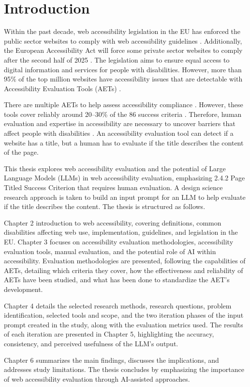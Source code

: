\chapter{Introduction\label{intro}}

Within the past decade, web accessibility legislation in the EU has enforced the public sector websites to comply with web accessibility guidelines \citep{eudirective2016}. Additionally, the European Accessibility Act will force some private sector websites to comply after the second half of 2025 \citep{eudirective2019}. The legislation aims to ensure equal access to digital information and services for people with disabilities. However, more than 95\% of the top million websites have accessibility issues that are detectable with Accessibility Evaluation Tools (AETs) \citep{webaimmillions}.

There are multiple AETs to help assess accessibility compliance \citep{govukaccessibility}. However, these tools cover reliably around 20--30\% of the 86 success criteria \citep{govukaccessibilityresults, dequecoverage, webaimmillions}. Therefore, human evaluation and expertise in accessibility are necessary to uncover barriers that affect people with disabilities \citep{wcagevaluationtools}. An accessibility evaluation tool can detect if a website has a title, but a human has to evaluate if the title describes the content of the page. 

This thesis explores web accessibility evaluation and the potential of Large Language Models (LLMs) in web accessibility evaluation, emphasizing 2.4.2 Page Titled Success Criterion that requires human evaluation. A design science research approach is taken to build an input prompt for an LLM to help evaluate if the title describes the content. The thesis is structured as follows.

Chapter 2 introduction to web accessibility, covering definitions, common disabilities affecting web use, implementation, guidelines, and legislation in the EU. Chapter 3 focuses on accessibility evaluation methodologies, accessibility evaluation tools, manual evaluation, and the potential role of AI within accessibility. Evaluation methodologies are presented, following the capabilities of AETs, detailing which criteria they cover, how the effectiveness and reliability of AETs have been studied, and what has been done to standardize the AET's development.

Chapter 4 details the selected research methods, research questions, problem identification, selected tools and scope, and the two iteration phases of the input prompt created in the study, along with the evaluation metrics used. The results of each iteration are presented in Chapter 5, highlighting the accuracy, consistency, and perceived usefulness of the LLM's output.

Chapter 6 summarizes the main findings, discusses the implications, and addresses study limitations. The thesis concludes by emphasizing the importance of web accessibility evaluation through AI-assisted approaches.